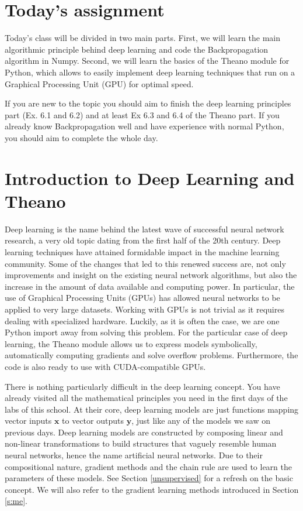 \section{Today's assignment}
Today's class will be divided in two main parts. First, we will learn the main 
algorithmic principle behind deep learning and code the Backpropagation algorithm 
in Numpy. Second, we will learn the basics of the Theano module for Python, 
which allows to easily implement deep learning techniques that run on a 
Graphical Processing Unit (GPU) for optimal speed. 

If you are new to the topic you should aim to finish the deep learning 
principles part (Ex. 6.1 and 6.2) and at least Ex 6.3 and 6.4 of the Theano 
part. If you already know Backpropagation well and have experience with normal 
Python, you should aim to complete the whole day. 

\section{Introduction to Deep Learning and Theano}

Deep learning is the name behind the latest wave of successful neural network 
research, a very old topic dating from the first half of the 20th century. Deep 
learning techniques have attained formidable impact in the machine learning 
community. 
Some of the changes that led to this renewed success are, not only
improvements and insight on the existing neural network algorithms, but also
the increase in the amount of data available and computing power. In
particular, the use of Graphical Processing Units (GPUs) has allowed neural
networks to be applied to very large datasets. Working with GPUs is not trivial
as it requires dealing with specialized hardware. Luckily, as it is often the
case, we are one Python import away from solving this problem. For the
particular case of deep learning, the
Theano\footnotemark{}
module allows us to express models symbolically, automatically computing
gradients and solve overflow problems. Furthermore, the code is also ready to
use with CUDA-compatible GPUs.

There is nothing particularly difficult in the deep learning concept. You have
already visited all the mathematical principles you need in the first days of the
labs of this school. At their core, deep learning models are just functions
mapping vector inputs $\mathbf{x}$ to vector outputs $\mathbf{y}$, just like any
of the models we saw on previous days. Deep learning models are constructed by
composing linear and non-linear transformations to build structures that vaguely
resemble human neural networks, hence the name artificial neural networks. Due
to their compositional nature, gradient methods and the chain rule are used to
learn the parameters of these models. See Section \ref{unsupervised} for a
refresh on the basic concept. We will also refer to the gradient
learning methods introduced in Section \ref{s:me}. 

